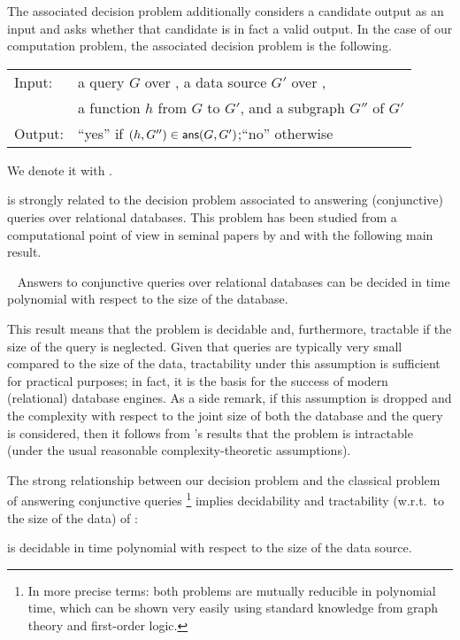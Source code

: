 The associated decision problem additionally considers a candidate output as an input
and asks whether that candidate is in fact a valid output.
In the case of our computation problem, the associated decision problem is the following.

\begin{center}
  \begin{tabular}{ll}
    \hline\rule{0pt}{12pt}%
    Input:  & a query $G$ over \namespace, a data source $G'$ over \namespace, \\
            & a function $h$ from $G$ to $G'$, and a subgraph $G''$ of $G'$ \\[2pt]
    Output: & \enquote{yes} if $(h,G'') \in \textsf{ans}(G,G')$;\quad \enquote{no} otherwise \\[1pt]
    \hline
  \end{tabular}
\end{center}

We denote it with .

 is strongly related to the decision problem associated to
answering (conjunctive) queries over relational databases.
This problem has been studied from a computational point of view in seminal papers
by \textcite{Vardi1982} and \textcite{Chandra1977} with the following main result.
%
\begin{theorem}
  \textup{\autocite{Vardi1982}}~
  Answers to conjunctive queries over relational databases
  can be decided in time polynomial with respect to the size of the database.
\end{theorem}
%
This result means that the problem is decidable
and, furthermore, tractable if the size of the query is neglected.
Given that queries are typically very small compared to the size of the data,
tractability under this assumption is sufficient for practical purposes;
in fact, it is the basis for the success of modern (relational) database engines.
As a side remark, if this assumption is dropped and the complexity with respect
to the joint size of both the database and the query is considered,
then it follows from \citeauthor{Chandra1977}'s \autocite*{Chandra1977}
results that the problem 
is intractable (under the usual reasonable complexity-theoretic assumptions).

The strong relationship between our decision problem 
and the classical problem of answering conjunctive queries%
\footnote{In more precise terms: both problems are mutually reducible in polynomial time,
which can be shown very easily using standard knowledge from graph theory and first-order logic.}
implies decidability and tractability (w.r.t.\ to the size of the data)
of :
%
\begin{corollary}
   is decidable
  in time polynomial with respect to the size of the data source.
\end{corollary}
%


